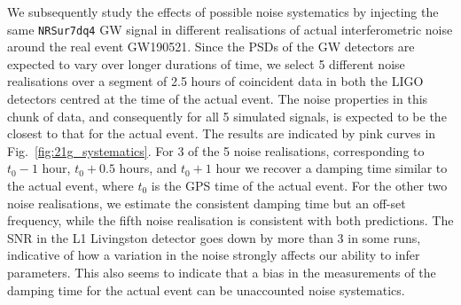 \documentclass[twocolumn,prd,aps,superscriptaddress,preprintnumbers,tightenlines,showpacs,nofootinbib,eqsecnum,amsfonts,amsmath]{revtex4-1}
\begin{document}
We subsequently study the effects of possible noise systematics by injecting the same \texttt{NRSur7dq4} GW signal in different realisations of actual interferometric noise around the real event GW190521. Since the PSDs of the GW detectors are expected to vary over longer durations of time, we select 5 different noise realisations over a segment of 2.5 hours of coincident data in both the LIGO detectors centred at the time of the actual event. The noise properties in this chunk of data, and consequently for all 5 simulated signals, is expected to be the closest to that for the actual event. The results are indicated by pink curves in Fig.~\ref{fig:21g_systematics}. For 3 of the 5 noise realisations, corresponding to $t_0-1$ hour, $t_0+0.5$ hours, and $t_0+1$ hour we recover a damping time similar to the actual event, where $t_0$ is the GPS time of the actual event. For the other two noise realisations, we estimate the consistent damping time but an off-set frequency, while the fifth noise realisation is consistent with both predictions. The SNR in the L1 Livingston detector goes down by more than 3 in some runs, indicative of how a variation in the noise strongly affects our ability to infer parameters. This also seems to indicate that a bias in the measurements of the damping time for the actual event can be unaccounted noise systematics.


%


\end{document}
